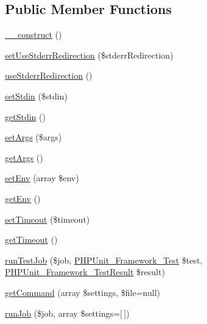 \subsection*{Public Member Functions}
\begin{DoxyCompactItemize}
\item 
\mbox{\hyperlink{class_p_h_p_unit___util___p_h_p_a095c5d389db211932136b53f25f39685}{\+\_\+\+\_\+construct}} ()
\item 
\mbox{\hyperlink{class_p_h_p_unit___util___p_h_p_a836dbb38b92ae3e0017f6941e5b1e3d6}{set\+Use\+Stderr\+Redirection}} (\$stderr\+Redirection)
\item 
\mbox{\hyperlink{class_p_h_p_unit___util___p_h_p_a764c3409ca6e1322c1e157bcf35da371}{use\+Stderr\+Redirection}} ()
\item 
\mbox{\hyperlink{class_p_h_p_unit___util___p_h_p_ad0719eb468cc64c6c572393d7fe7eab0}{set\+Stdin}} (\$stdin)
\item 
\mbox{\hyperlink{class_p_h_p_unit___util___p_h_p_ade85314bc074191bf57b0a76acff7a07}{get\+Stdin}} ()
\item 
\mbox{\hyperlink{class_p_h_p_unit___util___p_h_p_adba27a494b188ed418bfd1cb078751a6}{set\+Args}} (\$args)
\item 
\mbox{\hyperlink{class_p_h_p_unit___util___p_h_p_a19dde99d8deb1c2e72d40e191fee96b0}{get\+Args}} ()
\item 
\mbox{\hyperlink{class_p_h_p_unit___util___p_h_p_adea8b98e918c35781622f3ab86f1f07c}{set\+Env}} (array \$env)
\item 
\mbox{\hyperlink{class_p_h_p_unit___util___p_h_p_af7e05155f430839d67e1c4e4d9431560}{get\+Env}} ()
\item 
\mbox{\hyperlink{class_p_h_p_unit___util___p_h_p_a3d80d4d51ec21d8237d6ed6808d70b8e}{set\+Timeout}} (\$timeout)
\item 
\mbox{\hyperlink{class_p_h_p_unit___util___p_h_p_abac5019c5daf3a27d739aa3a249fdb31}{get\+Timeout}} ()
\item 
\mbox{\hyperlink{class_p_h_p_unit___util___p_h_p_ac1c698a00cb5bf7facc9305d3086a173}{run\+Test\+Job}} (\$job, \mbox{\hyperlink{interface_p_h_p_unit___framework___test}{P\+H\+P\+Unit\+\_\+\+Framework\+\_\+\+Test}} \$test, \mbox{\hyperlink{class_p_h_p_unit___framework___test_result}{P\+H\+P\+Unit\+\_\+\+Framework\+\_\+\+Test\+Result}} \$result)
\item 
\mbox{\hyperlink{class_p_h_p_unit___util___p_h_p_a2c4a30cba6979f1463dfe4dc50d7bd9f}{get\+Command}} (array \$settings, \$file=null)
\item 
\mbox{\hyperlink{class_p_h_p_unit___util___p_h_p_a2bdd3292fd85da0f0f30ac8d70bf7ee3}{run\+Job}} (\$job, array \$settings=\mbox{[}$\,$\mbox{]})
\end{DoxyCompactItemize}
